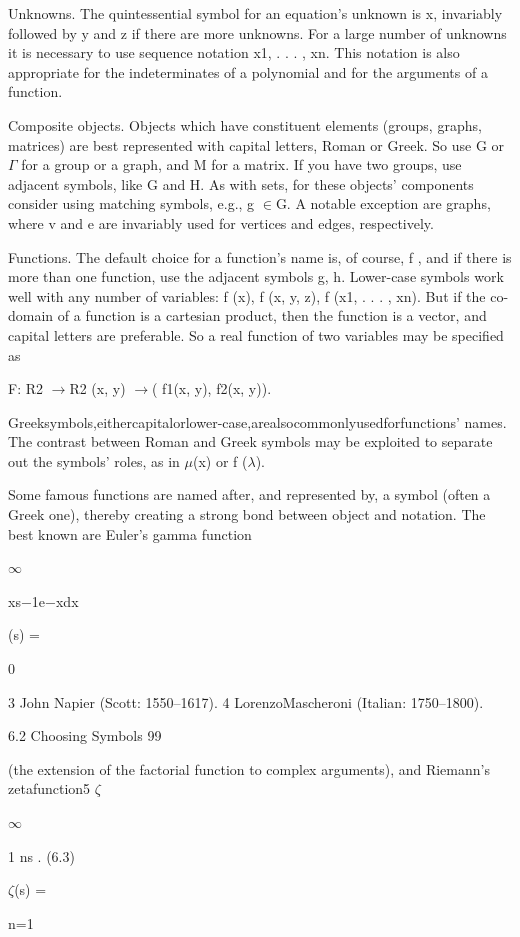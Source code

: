 \documentclass[11pt]{article}
\theoremstyle{plain}
\theoremstyle{definition}
\begin{document}
Unknowns. The quintessential symbol for an equation's unknown is x, invariably followed by y and z if there are more unknowns. For a large number of unknowns it is necessary to use sequence notation x1, . . . , xn. This notation is also appropriate for the indeterminates of a polynomial and for the arguments of a function.

Composite objects. Objects which have constituent elements (groups, graphs, matrices) are best represented with capital letters, Roman or Greek. So use G or $\Gamma$ for a group or a graph, and M for a matrix. If you have two groups, use adjacent symbols, like G and H. As with sets, for these objects' components consider using matching symbols, e.g., g $\in$G. A notable exception are graphs, where v and e are invariably used for vertices and edges, respectively.

Functions. The default choice for a function's name is, of course, f , and if there is more than one function, use the adjacent symbols g, h. Lower-case symbols work well with any number of variables: f (x), f (x, y, z), f (x1, . . . , xn). But if the co-domain of a function is a cartesian product, then the function is a vector, and capital letters are preferable. So a real function of two variables may be specified as

F: R2 $\to$R2 (x, y) $\to$( f1(x, y), f2(x, y)).

Greeksymbols,eithercapitalorlower-case,arealsocommonlyusedforfunctions' names. The contrast between Roman and Greek symbols may be exploited to separate out the symbols' roles, as in $\mu$(x) or f ($\lambda$).

Some famous functions are named after, and represented by, a symbol (often a Greek one), thereby creating a strong bond between object and notation. The best known are Euler's gamma function

$\infty$

xs$-$1e$-$xdx

(s) =

0

3 John Napier (Scott: 1550--1617). 4 LorenzoMascheroni (Italian: 1750--1800).

6.2 Choosing Symbols 99

(the extension of the factorial function to complex arguments), and Riemann's zetafunction5 $\zeta$

$\infty$

1 ns . (6.3)

$\zeta$(s) =

n=1
\end{document}
